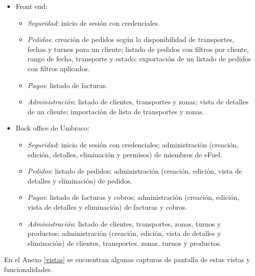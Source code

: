 \begin{itemize}
    \item Front end:
    \begin{itemize}
        \item \emph{Seguridad}: inicio de sesión con credenciales.
        
        \item \emph{Pedidos}: creación de pedidos según la disponibilidad de transportes, fechas y turnos para un cliente; listado de pedidos con filtros por cliente, rango de fecha, transporte y estado; exportación de un listado de pedidos con filtros aplicados.
    
        \item \emph{Pagos}: listado de facturas.
        
        \item \emph{Administración}: listado de clientes, transportes y zonas; vista de detalles de un cliente; importación de lista de transportes y zonas.
    \end{itemize}

    \item Back office de Umbraco:
    \begin{itemize}
        \item \emph{Seguridad}: inicio de sesión con credenciales; administración (creación, edición, detalles, eliminación y permisos) de miembros de eFuel.
        
        \item \emph{Pedidos}: listado de pedidos; administración (creación, edición, vista de detalles y eliminación) de pedidos.
        
        \item \emph{Pagos}: listado de facturas y cobros; administración (creación, edición, vista de detalles y eliminación) de facturas y cobros.
        
        \item \emph{Administración}: listado de clientes, transportes, zonas, turnos y productos; administración (creación, edición, vista de detalles y eliminación) de clientes, transportes, zonas, turnos y productos.
    \end{itemize}
\end{itemize}

En el Anexo \ref{vistas} se encuentran algunas capturas de pantalla de estas vistas y funcionalidades.